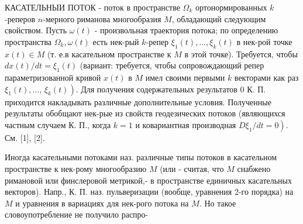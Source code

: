 \documentclass[10pt]{article}
\begin{document}
КАСАТЕЛЬНЫИ ПОТОК - поток в пространстве $\Omega_{k}$ ортонормированных $k$-реперов $n$-мерного риманова многообразия $M$, обладающий следующим свойством. Пусть $\omega(t)$ - произвольная траектория потока; по определению пространства $\Omega_{k}, \omega(t)$ есть нек-рый $k$-репер $\xi_{1}(t), \ldots, \xi_{k}(t)$ в нек-рой точке $x(t) \in M$ (т. е.в касательном пространстве к $M$ в этой точке). Требуется, чтобы $d x(t) / d t=\xi_{1}(t)$ (вариант: требуется, чтобы сопровождающий репер параметризованной кривой $x(t)$ в $M$ имел своими первыми $k$ векторами как раз $\xi_{1}(t), \ldots$, $\left.\xi_{k}(t)\right)$. Для получения содержательных результатов 0 К. П. приходится накладывать различные дополнительные условия. Полученные результаты обобщают нек-рые из свойств геодезических потоков (являющихся частным случаем К. П., когда $k=1$ и ковариантная производная $\left.D \xi_{1} / d t=0\right)$. См. [1], [2].



Иногда касательными потоками наз. различные типы потоков в касательном пространстве к нек-рому многообразию $M$ (или - считая, что $M$ снабжено римановой или финслеровой метрикой,- в пространстве единичных касательных векторов). Напр., К. П. наз. пульверизации (вообще, уравнения 2-го порядка) на $M$ и уравнения в вариациях для нек-рого потока на $M$. Но такое словоупотребление не получило распро-
\end{document}
